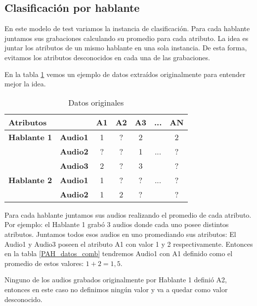 \subsection{Clasificación por hablante}
\label{prom_los_atributos_de_cada_hablante}

En este modelo de test variamos la instancia de clasificación. Para cada hablante juntamos sus grabaciones  calculando su promedio para cada atributo. La idea es juntar los atributos de un mismo hablante en una sola instancia. De esta forma, evitamos los atributos desconocidos en cada una de las grabaciones. 

En la tabla \ref{datos_orig} vemos un ejemplo de datos extraídos originalmente para entender mejor la idea. 

\begin{table}[H]
	\centering
	\begin{tabular}{|l|l|ccccc|}
		\hline
		\multicolumn{2}{|l|}{Atributos} & A1 & A2 & A3 & ... & AN \\
		\hline 
		\textbf{Hablante 1} & \textbf{Audio1} & 1 & ? & 2 & & 2\\
		& \textbf{Audio2} & ? & ? & 1 & ... & ? \\
		& \textbf{Audio3} & 2 & ? & 3 & & ? \\
		\hline
		\textbf{Hablante 2} & \textbf{Audio1} & 1 & ? & ? & ... & ? \\
		& \textbf{Audio2} & 1 & 2 & ? & & ? \\
		\hline
	\end{tabular}
	\caption{Datos originales}
	\label{datos_orig}
\end{table}

Para cada hablante juntamos sus audios realizando el promedio de cada atributo. Por ejemplo: el Hablante 1 grabó 3 audios donde cada uno posee distintos atributos. Juntamos todos esos audios en uno promediando sus atributos: El Audio1 y Audio3 poseen el atributo A1 con valor 1 y 2 respectivamente. Entonces en la tabla \ref{PAH_datos_comb} tendremos Audio1 con A1 definido como el promedio de estos valores: $1 + 2 = 1,5$. 

Ninguno de los audios grabados originalmente por Hablante 1 definió A2, entonces en este caso no definimos ningún valor y va a quedar como valor desconocido. 

